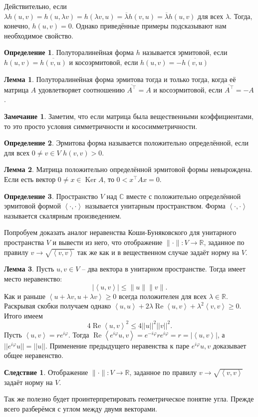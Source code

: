 \documentclass[10pt,a4paper,oneside]{book} %
\theoremstyle{definition}
\newtheorem*{rem}{Замечание}
\newtheorem*{defn}{Определение}
\newtheorem{lem}{Лемма}
\newtheorem{cor}{Следствие}
\newcommand{\mb}[1]{\mathbb{#1}}
\newcommand{\ovl}{\overline}
\DeclareMathOperator{\Ker}{Ker}
\renewcommand{\Re}{\operatorname{Re}}
\def\ffi{\varphi}
\def\lan{\left\langle }
\def\ran{\right\rangle}
\def\dfn{\begin{defn}}
\def\edfn{\end{defn}}
\def\lm{\begin{lem}}
\def\elm{\end{lem}}
\def\crl{\begin{cor}}
\def\ecrl{\end{cor}}
\def\rm{\begin{rem}}
\def\erm{\end{rem}}
\begin{document}
Действительно, если $\lambda h(u,v)=h(u,\lambda v) = h(\lambda v,u)=\ovl{\lambda}h(v,u)=\ovl{\lambda}h(u,v)$ для всех $\lambda$. Тогда, конечно, $h(u,v)=0$. Однако приведённые примеры подсказывают нам необходимое свойство.

\dfn Полуторалинейная форма $h$ называется эрмитовой, если $h(u,v)=\ovl{h(v,u)}$ и косоэрмитовой, если $h(u,v)=-\ovl{h(v,u)}$
\edfn

\lm Полуторалинейная форма эрмитова тогда и только тогда, когда её матрица $A$ удовлетворяет соотношению $\ovl{A^{\top}}=A$ и косоэрмитовой, если $\ovl{A^{\top}}=-A$.
\elm

\rm  Заметим, что если матрица была вещественными коэффициентами, то это просто условия  симметричности и кососимметричности.
\erm

\dfn Эрмитова форма называется положительно определённой, если для всех $0\neq v\in V$ $h(v,v)>0$.
\edfn

\lm Матрица положительно определённой эрмитовой формы невырождена.
\proof Если есть вектор $0\neq x\in \Ker A$, то $0<x^{\top}Ax = 0$.
\endproof
\elm

\dfn Пространство $V$ над $\mb C$ вместе с положительно определённой эрмитовой формой $\lan \cdot, \cdot \ran$ называется унитарным пространством. Форма $\lan \cdot, \cdot \ran$ называется скалярным произведением. 
\edfn

Попробуем доказать аналог неравенства Коши-Буняковского для унитарного пространства $V$ и вывести из него, что отображение $\|\cdot\| \colon V \to \mb R$, заданное по правилу $v\to \sqrt{\lan v,v\ran}$ так же как и в вещественном случае задаёт  норму на $V$.

\lm Пусть $u,v \in V$ -- два вектора в унитарном пространстве. Тогда имеет место неравенство:
$$|\lan u,v\ran| \leq \|u\| \|v\|.$$
\proof Как и раньше  $\lan u+\lambda v, u+\lambda v\ran \geq 0$ всегда положителен для всех $\lambda \in \mb R$. Раскрывая скобки получаем однако $\lan u,u\ran +2\lambda \Re\lan u,v\ran +\lambda^2\lan v,v\ran\geq 0$.  Итого имеем  $$4\Re\lan u,v\ran^2 \leq 4 ||u||^2||v||^2.$$
Пусть $\lan u ,v \ran = r e^{i\ffi}$. Тогда $\Re \lan  e^{i\ffi}u , v \ran= e^{-i\ffi} r e^{i\ffi}=r=|\lan u,v\ran|$, а $||e^{i\ffi}u||=||u||$. Применение предыдущего неравенства  к паре $e^{i\ffi} u, v$ доказывает общее неравенство.
\endproof
\elm

\crl Отображение $\|\cdot\| \colon V \to \mb R$, заданное по правилу $v\to \sqrt{\lan v,v\ran}$ задаёт  норму на $V$.
\ecrl


Так же полезно будет проинтерпретировать геометрическое понятие угла. Прежде всего разберёмся с углом между двумя векторами.
\end{document}
